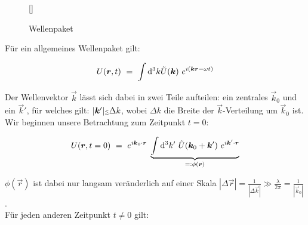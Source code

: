 \begin{wrapfigure}[12]{r}[0cm]{0cm}
	\raisebox{0pt}[\dimexpr{}\baselineskip\relax]{
		\colorbox{hgrey}{
		}
	}
	\caption{Wellenpaket}
\end{wrapfigure}

Für ein allgemeines Wellenpaket gilt:

\begin{equation*}
U(\bm{r},t)  \ = \ \int\mathrm{d}^3 k  \tilde{U}(\bm{k}) \ e^{i(\bm{k}\bm{r}-\omega t)}
\end{equation*}

Der Wellenvektor $\vec{k}$ lässt sich dabei in zwei Teile aufteilen: ein zentrales $\vec{k}_0$ und ein $\vec{k}'$, für welches gilt: $|\vec{k}'| \mathsmaller{\mathsmaller{\lesssim}} \Delta k$, wobei $\Delta k$ die Breite der $\vec{k}$-Verteilung um $\vec{k}_0$ ist.\\
Wir beginnen unsere Betrachtung zum Zeitpunkt $t=0$:

\begin{equation*}
U(\bm{r},t=0) \ = \ e^{i\bm{k}_0 \cdot\bm{r}} \; \underbrace{\int\mathrm{d}^3 k' \ \tilde{U}(\bm{k}_0 + \bm{k}') \ e^{i\bm{k}'\cdot\bm{r}}}_{=: \phi(\bm{r})}
\end{equation*}

$\phi(\vec{r})$ ist dabei nur langsam veränderlich auf einer Skala $|\Delta \vec{r}| = \frac{1}{|\Delta \vec{k}|} \gg \frac{\lambda}{2\pi}= \frac{1}{|\vec{k}_0|}$.\\ \newpage
Für jeden anderen Zeitpunkt $t \neq 0$ gilt:

